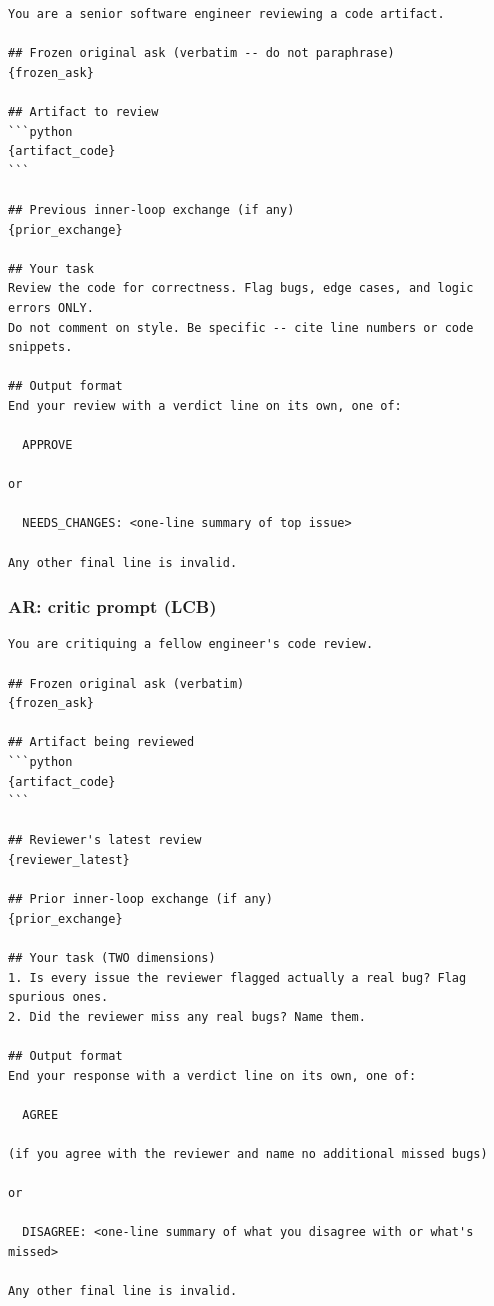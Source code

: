 \documentclass{article}
\begin{document}
\begin{footnotesize}
\begin{verbatim}
You are a senior software engineer reviewing a code artifact.

## Frozen original ask (verbatim -- do not paraphrase)
{frozen_ask}

## Artifact to review
```python
{artifact_code}
```

## Previous inner-loop exchange (if any)
{prior_exchange}

## Your task
Review the code for correctness. Flag bugs, edge cases, and logic errors ONLY.
Do not comment on style. Be specific -- cite line numbers or code snippets.

## Output format
End your review with a verdict line on its own, one of:

  APPROVE

or

  NEEDS_CHANGES: <one-line summary of top issue>

Any other final line is invalid.
\end{verbatim}
\end{footnotesize}

\subsubsection{AR: critic prompt (LCB)}

\begin{footnotesize}
\begin{verbatim}
You are critiquing a fellow engineer's code review.

## Frozen original ask (verbatim)
{frozen_ask}

## Artifact being reviewed
```python
{artifact_code}
```

## Reviewer's latest review
{reviewer_latest}

## Prior inner-loop exchange (if any)
{prior_exchange}

## Your task (TWO dimensions)
1. Is every issue the reviewer flagged actually a real bug? Flag spurious ones.
2. Did the reviewer miss any real bugs? Name them.

## Output format
End your response with a verdict line on its own, one of:

  AGREE

(if you agree with the reviewer and name no additional missed bugs)

or

  DISAGREE: <one-line summary of what you disagree with or what's missed>

Any other final line is invalid.
\end{verbatim}
\end{footnotesize}
\end{document}
